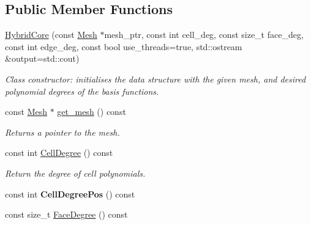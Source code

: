 \subsection*{Public Member Functions}
\begin{DoxyCompactItemize}
\item 
\hyperlink{classHArDCore3D_1_1HybridCore_af74bfd2755cae90735669032bec84918}{Hybrid\+Core} (const \hyperlink{classHArDCore3D_1_1Mesh}{Mesh} $\ast$mesh\+\_\+ptr, const int cell\+\_\+deg, const size\+\_\+t face\+\_\+deg, const int edge\+\_\+deg, const bool use\+\_\+threads=true, std\+::ostream \&output=std\+::cout)
\begin{DoxyCompactList}\small\item\em Class constructor\+: initialises the data structure with the given mesh, and desired polynomial degrees of the basis functions. \end{DoxyCompactList}\item 
\mbox{\label{classHArDCore3D_1_1HybridCore_af9413be657df06123c1544d16df6b137}} 
const \hyperlink{classHArDCore3D_1_1Mesh}{Mesh} $\ast$ \hyperlink{classHArDCore3D_1_1HybridCore_af9413be657df06123c1544d16df6b137}{get\+\_\+mesh} () const
\begin{DoxyCompactList}\small\item\em Returns a pointer to the mesh. \end{DoxyCompactList}\item 
\mbox{\label{classHArDCore3D_1_1HybridCore_a10e8b9bd521b54042cccd84520011fe9}} 
const int \hyperlink{classHArDCore3D_1_1HybridCore_a10e8b9bd521b54042cccd84520011fe9}{Cell\+Degree} () const
\begin{DoxyCompactList}\small\item\em Return the degree of cell polynomials. \end{DoxyCompactList}\item 
\mbox{\label{classHArDCore3D_1_1HybridCore_a3ddad16b636a2322ba97829304ce8781}} 
const int {\bfseries Cell\+Degree\+Pos} () const
\item 
\mbox{\label{classHArDCore3D_1_1HybridCore_abd72ee1721337185ed3c39da286e2928}} 
const size\+\_\+t \hyperlink{classHArDCore3D_1_1HybridCore_abd72ee1721337185ed3c39da286e2928}{Face\+Degree} () const

\end{DoxyCompactItemize}
